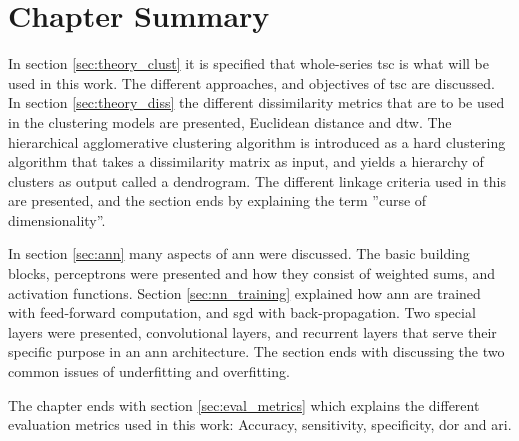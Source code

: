 \section{Chapter Summary}

In section \ref{sec:theory_clust} it is specified that whole-series \acrshort{tsc} is what will be used in this work. The different approaches, and objectives of \acrshort{tsc} are discussed. In section \ref{sec:theory_diss} the different dissimilarity metrics that are to be used in the clustering models are presented, Euclidean distance and \acrshort{dtw}. The hierarchical agglomerative clustering algorithm is introduced as a hard clustering algorithm that takes a dissimilarity matrix as input, and yields a hierarchy of clusters as output called a dendrogram. The different linkage criteria used in this are presented, and the section ends by explaining the term ''curse of dimensionality''. \bigskip

In section \ref{sec:ann} many aspects of \acrshort{ann} were discussed. The basic building blocks, perceptrons were presented and how they consist of weighted sums, and activation functions. Section \ref{sec:nn_training} explained how \acrshort{ann} are trained with feed-forward computation, and \acrshort{sgd} with back-propagation. Two special layers were presented, convolutional layers, and recurrent layers that serve their specific purpose in an \acrshort{ann} architecture. The section ends with discussing the two common issues of underfitting and overfitting. \bigskip
 
The chapter ends with section \ref{sec:eval_metrics} which explains the different evaluation metrics used in this work: Accuracy, sensitivity, specificity, \acrshort{dor} and \acrshort{ari}.
